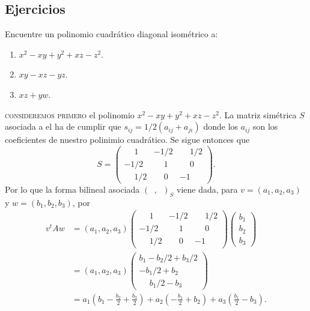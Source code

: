 \documentclass[twocolumn]{notasdeclase}
\newcommand{\Bform}{(\phantom{a},\phantom{a})}
\begin{document}
\subsection{Ejercicios}
\begin{ejer}
	Encuentre un polinomio cuadrático diagonal isométrico a:
	\begin{enumerate}
		\item $x^2-xy+y^2+xz-z^2$.
		\item $xy-xz-yz$.
		\item $xz+yw$.
	\end{enumerate}
\end{ejer}
\begin{sol}
	 \textsc{consideremos primero} el polinomio $x^2-xy+y^2+xz-z^2$. La matriz simétrica $S$ asociada a el ha de cumplir que $s_{ij}=1/2(a_{ij}+a_{ji})$ donde los $a_{ij}$ son los coeficientes de nuestro polinimio cuadrático. Se sigue entonces que
	 \[ S = \begin{pmatrix}
	 \phantom{-}1 & -1/2 & \phantom{-}1/2 \\
	 -1/2 & \phantom{-}1 & \phantom{-}0 \\
	 \phantom{-}1/2 & \phantom{-}0 & -1
	 \end{pmatrix}. \]
	 Por lo que la forma bilineal asociada $\Bform_S$ viene dada, para $v=(a_1,a_2,a_3)$ y $w=(b_1,b_2,b_3)$, por
	 \begin{align*}
	 	v^tAw &= (a_1,a_2,a_3) \begin{pmatrix}
	 	\phantom{-}1 & -1/2 & \phantom{-}1/2 \\
	 	-1/2 & \phantom{-}1 & \phantom{-}0 \\
	 	\phantom{-}1/2 & \phantom{-}0 & -1
	 	\end{pmatrix} \begin{pmatrix}
	 	b_1 \\ b_2 \\ b_3
	 	\end{pmatrix} \\
	 	&= (a_1,a_2,a_3) \begin{pmatrix}
	 	b_1-b_2/2+b_3/2 \\
	 	-b_1/2+b_2 \\
	 	\phantom{-}b_1/2 - b_3
	 	\end{pmatrix} \\
	 	&= a_1(b_1-\frac{b_2}{2}+\frac{b_3}{2}) + a_2(-\frac{b_1}{2}+b_2) + a_3(\frac{b_1}{2} - b_3). 

\end{align*}
\end{sol}
\end{document}
